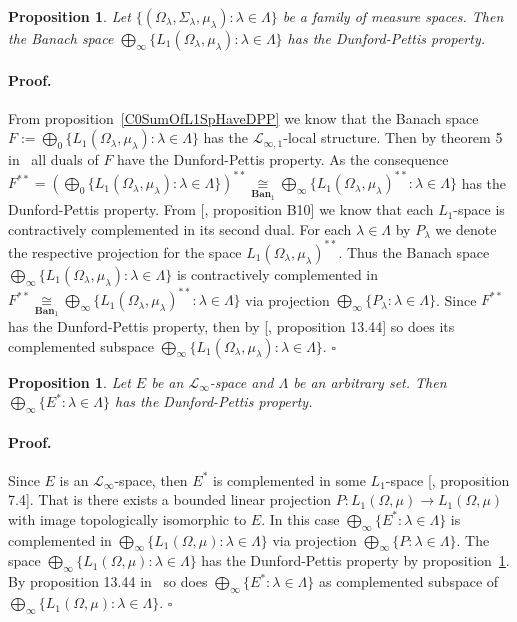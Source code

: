 \documentclass[12pt]{article}
\newcommand{\isom}[1]{\mathop{\mathbin{\cong}}\limits_{#1}}
\newtheorem{proposition}[theorem]{Proposition}
\renewenvironment{proof}{\paragraph{Proof.}}{\hfill$\square$\medskip}
\begin{document}
\begin{proposition}\label{ProdOfL1SpHaveDPP} Let
    $\{(\Omega_\lambda,\Sigma_\lambda,\mu_\lambda):\lambda\in\Lambda \}$ be a
    family of measure spaces. Then the Banach space
    $\bigoplus_\infty \{L_1(\Omega_\lambda,\mu_\lambda):\lambda\in\Lambda \}$
    has the Dunford-Pettis property.
\end{proposition}
\begin{proof} From proposition~\ref{C0SumOfL1SpHaveDPP} we know that the Banach
    space $F:=\bigoplus_0\{L_1(\Omega_\lambda,\mu_\lambda):\lambda\in\Lambda \}$
    has the $\mathcal{L}_{\infty,1}$-local structure. Then by theorem 5
    in~\cite{BourgOnTheDPP} all duals of $F$ have the Dunford-Pettis property.
    As the consequence
    $F^{**}=
        {\left(\bigoplus_0
            \{L_1(\Omega_\lambda,\mu_\lambda):\lambda\in\Lambda \} 
        \right)}^{**}
        \isom{\mathbf{Ban}_1} 
        \bigoplus_\infty \{
            {L_1(\Omega_\lambda,\mu_\lambda)}^{**}:\lambda\in\Lambda 
    \}$ 
    has the Dunford-Pettis property. 
    From [\cite{DefFloTensNorOpId}, proposition B10] we
    know that each $L_1$-space is contractively complemented in its second dual.
    For each $\lambda\in\Lambda$ by $P_\lambda$ we denote the respective
    projection for the space ${L_1(\Omega_\lambda,\mu_\lambda)}^{**}$. Thus the
    Banach space $\bigoplus_\infty
        \{L_1(\Omega_\lambda,\mu_\lambda):\lambda\in\Lambda \}$ is contractively
    complemented in $F^{**} \isom{\mathbf{Ban}_1} \bigoplus_\infty
        \{{L_1(\Omega_\lambda,\mu_\lambda)}^{**}:\lambda\in\Lambda \}$ via
    projection $\bigoplus_\infty \{P_\lambda:\lambda\in\Lambda \}$. Since
    $F^{**}$ has the Dunford-Pettis property, then by
    [\cite{FabHabBanSpTh}, proposition 13.44] so does its complemented subspace
    $\bigoplus_\infty \{L_1(\Omega_\lambda,\mu_\lambda):\lambda\in\Lambda \}$.
\end{proof}

\begin{proposition}\label{ProdOfDualsOfMthscrLInftySpHaveDPP} Let $E$ be an
    $\mathscr{L}_\infty$-space and $\Lambda$ be an arbitrary set. Then
    $\bigoplus_\infty \{E^*:\lambda\in\Lambda \}$ has the Dunford-Pettis
    property.
\end{proposition}
\begin{proof} Since $E$ is an $\mathscr{L}_\infty$-space, then $E^*$ is
    complemented in some $L_1$-space [\cite{LinPelAbsSumOpInLpSpAndApp},
    proposition 7.4]. That is there exists a bounded linear projection
    $P:L_1(\Omega,\mu)\to L_1(\Omega,\mu)$ with image topologically isomorphic
    to $E$. In this case $\bigoplus_\infty \{ E^*:\lambda\in\Lambda \}$ is
    complemented in $\bigoplus_\infty \{ L_1(\Omega,\mu):\lambda\in\Lambda \}$
    via projection $\bigoplus_\infty \{P:\lambda\in\Lambda \}$. The space
    $\bigoplus_\infty \{L_1(\Omega,\mu):\lambda\in\Lambda \}$ has the
    Dunford-Pettis property by proposition~\ref{ProdOfL1SpHaveDPP}. By
    proposition 13.44 in~\cite{FabHabBanSpTh} so does $\bigoplus_\infty
        \{E^*:\lambda\in\Lambda \}$ as complemented subspace of
    $\bigoplus_\infty \{L_1(\Omega,\mu):\lambda\in\Lambda \}$.
\end{proof}
\end{document}

